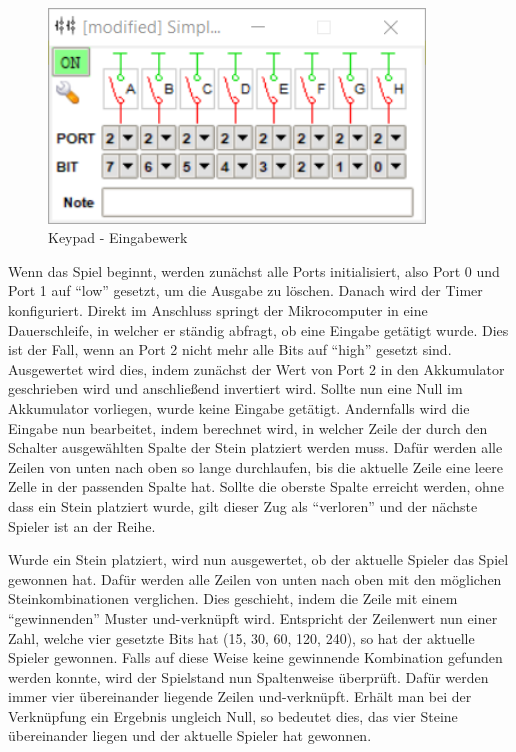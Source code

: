 \begin{figure}
	\centering
	\includegraphics[width=10cm]{keypad.png}
	\caption{Keypad - Eingabewerk}
	\label{img:grafik-keypad}
\end{figure}

Wenn das Spiel beginnt, werden zunächst alle Ports initialisiert, also Port 0 und Port 1 auf \enquote{low} gesetzt, um die Ausgabe zu löschen.
Danach wird der Timer konfiguriert.
Direkt im Anschluss springt der Mikrocomputer in eine Dauerschleife, in welcher er ständig abfragt, ob eine Eingabe getätigt wurde.
Dies ist der Fall, wenn an Port 2 nicht mehr alle Bits auf \enquote{high} gesetzt sind. 
Ausgewertet wird dies, indem zunächst der Wert von Port 2 in den Akkumulator geschrieben wird und anschließend invertiert wird. Sollte nun eine Null im Akkumulator vorliegen, wurde keine Eingabe getätigt.
Andernfalls wird die Eingabe nun bearbeitet, indem berechnet wird, in welcher Zeile der durch den Schalter ausgewählten Spalte der Stein platziert werden muss. Dafür werden alle Zeilen von unten nach oben so lange durchlaufen, bis die aktuelle Zeile eine leere Zelle in der passenden Spalte hat. Sollte die oberste Spalte erreicht werden, ohne dass ein Stein platziert wurde, gilt dieser Zug als \enquote{verloren} und der nächste Spieler ist an der Reihe.

Wurde ein Stein platziert, wird nun ausgewertet, ob der aktuelle Spieler das Spiel gewonnen hat. Dafür werden alle Zeilen von unten nach oben mit den möglichen Steinkombinationen verglichen. Dies geschieht, indem die Zeile mit einem \enquote{gewinnenden} Muster und-verknüpft wird. Entspricht der Zeilenwert nun einer Zahl, welche vier gesetzte Bits hat (15, 30, 60, 120, 240), so hat der aktuelle Spieler gewonnen.
Falls auf diese Weise keine gewinnende Kombination gefunden werden konnte, wird der Spielstand nun Spaltenweise überprüft. Dafür werden immer vier übereinander liegende Zeilen und-verknüpft. Erhält man bei der Verknüpfung ein Ergebnis ungleich Null, so bedeutet dies, das vier Steine übereinander liegen und der aktuelle Spieler hat gewonnen.

